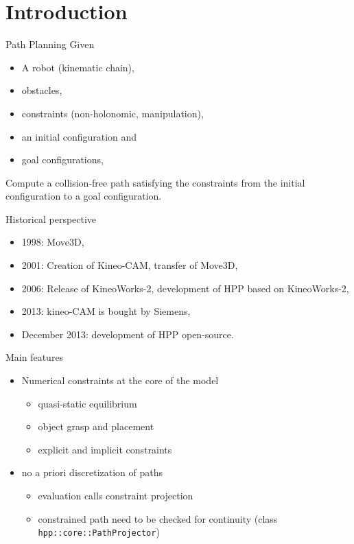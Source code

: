 \section{Introduction}
%
%
\begin {frame} {Path Planning}
  Given
  \begin{itemize}
  \item A robot (kinematic chain),
  \pause
  \item obstacles,
  \pause
  \item constraints (non-holonomic, manipulation),
  \pause
  \item an initial configuration and
  \item goal configurations,
\end{itemize}
  \pause
  Compute a collision-free path satisfying the constraints from the initial
  configuration to a goal configuration.
\end {frame}

%
%

\begin {frame} {Historical perspective}
  \begin{itemize}
    \item 1998: Move3D,
      \pause
    \item 2001: Creation of Kineo-CAM, transfer of Move3D,
      \pause
    \item 2006: Release of KineoWorks-2, development of HPP based on KineoWorks-2,
      \pause
    \item 2013: kineo-CAM is bought by Siemens,
      \pause
    \item December 2013: development of HPP open-source.
  \end{itemize}
\end {frame}

%
%

\begin {frame} {Main features}
  \begin {itemize}
  \item Numerical constraints at the core of the model
    \begin {itemize}
    \item quasi-static equilibrium
    \item object grasp and placement
    \item explicit and implicit constraints
    \end {itemize}
    \pause
  \item no a priori discretization of paths
    \begin {itemize}
    \item evaluation calls constraint projection
    \item constrained path need to be checked for continuity (class \texttt{hpp::core::PathProjector})
    \end {itemize}
  \end {itemize}
\end{frame}

